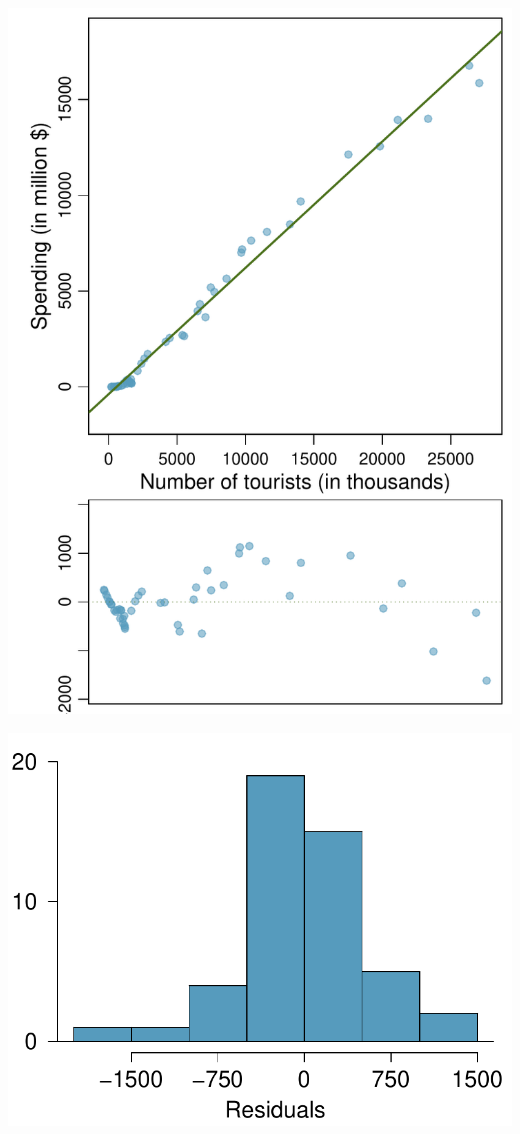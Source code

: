 {\begin{center}
\begin{minipage}[c]{0.55\textwidth}
\includegraphics[width=\textwidth]{07/figures/eoce/tourism/tourism_scat}
\end{minipage}\hspace{5mm}%
\begin{minipage}[c]{0.4\textwidth}
\includegraphics[width=\textwidth]{07/figures/eoce/tourism/tourism_resHist}
\end{minipage}
\end{center}
}{}

